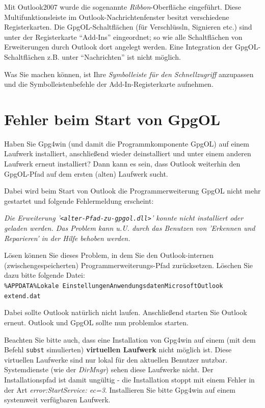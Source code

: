 \documentclass[a4paper,11pt, oneside,openright,titlepage,dvips]{scrbook}
\newcommand{\Filename}[1]{\texttt{#1}}
\newcounter{chapter}
\newcounter{section}[chapter]
\begin{document}
Mit Outlook2007 wurde die sogenannte \textit{Ribbon}-Oberfläche
eingeführt. Diese Multifunktionsleiste im Outlook-Nachrichtenfenster
besitzt verschiedene Registerkarten.
Die GpgOL-Schaltflächen (für Verschlüssln, Signieren etc.) sind
unter der Registerkarte "`Add-Ins"' eingeordnet; so wie alle
Schaltflächen von Erweiterungen durch Outlook dort angelegt werden. 
Eine Integration der GpgOL-Schaltflächen z.B. unter "`Nachrichten"' 
ist nicht möglich.

Was Sie machen können, ist Ihre \textit{Symbolleiste für den
Schnellzugriff} anzupassen und die Symbolleistenbefehle der Add-In-Registerkarte 
aufnehmen.


\section{Fehler beim Start von GpgOL}

Haben Sie Gpg4win (und damit die Programmkomponente GpgOL) auf einem Laufwerk
installiert, anschließend wieder deinstalliert und unter einem anderen
Laufwerk erneut installiert? Dann kann es sein, dass Outlook weiterhin den GpgOL-Pfad
auf dem ersten (alten) Laufwerk sucht.

Dabei wird beim Start von Outlook die Programmerweiterung GpgOL nicht mehr
gestartet und folgende Fehlermeldung erscheint:

\textit{Die Erweiterung '\Filename{<alter-Pfad-zu-gpgol.dll>}' konnte nicht installiert oder
geladen werden. Das Problem kann u.U. durch das Benutzen von 'Erkennen
und Reparieren' in der Hilfe behoben werden.}

Lösen können Sie dieses Problem, in dem Sie den Outlook-internen
(zwischengespeicherten) Programmerweiterungs-Pfad zurücksetzen.
Löschen Sie dazu bitte folgende Datei:\\
\Filename{\%APPDATA\%\back{}Lokale
Einstellungen\back{}Anwendungsdaten\back{}Microsoft\back{}Outlook\back{}\T\\ 
extend.dat}

Dabei sollte Outlook natürlich nicht laufen. Anschließend starten Sie
Outlook erneut. Outlook und GpgOL sollte nun problemlos starten.

Beachten Sie bitte auch, dass eine Installation von Gpg4win auf einem
(mit dem Befehl \texttt{subst} simulierten) \textbf{virtuellen
Laufwerk} nicht
möglich ist. Diese virtuellen Laufwerke sind nur lokal für den
aktuellen Benutzer nutzbar. Systemdienste (wie der \textit{DirMngr})
sehen diese Laufwerke nicht. Der Installationspfad ist damit ungültig
- die Installation stoppt mit einem Fehler in der Art \textit{error:StartService: ec=3}.
Installieren Sie bitte Gpg4win auf einem systemweit verfügbaren Laufwerk.
\end{document}
